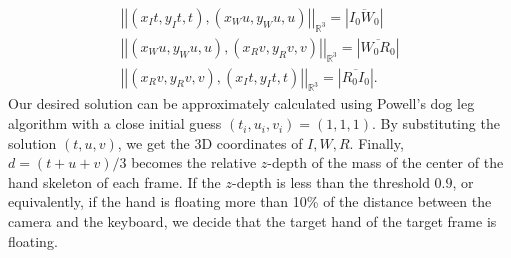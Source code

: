 \documentclass{article}
\begin{document}
\begin{gather}
    \left||(x_{I}t,y_{I}t,t),(x_{W}u,y_{W}u,u)|\right|_{\mathbb{R}^3}=\left|\overline{I_{0}W_{0}}\right| \\
    \left||(x_{W}u,y_{W}u,u),(x_{R}v,y_{R}v,v)|\right|_{\mathbb{R}^3}=\left|\overline{W_{0}R_{0}}\right| \\
    \left||(x_{R}v,y_{R}v,v),(x_{I}t,y_{I}t,t)|\right|_{\mathbb{R}^3}=\left|\overline{R_{0}I_{0}}\right|.
\end{gather}
%
Our desired solution can be approximately calculated using Powell's dog leg algorithm with a close initial guess $(t_i,u_i,v_i)=(1,1,1)$. By substituting the solution $(t,u,v)$, we get the 3D coordinates of $I,W,R$.  Finally, $d=(t+u+v)/3$ becomes the relative $z$-depth of the mass of the center of the hand skeleton of each frame. If the $z$-depth is less than the threshold $0.9$, or equivalently, if the hand is floating more than 10\% of the distance between the camera and the keyboard, we decide that the target hand of the target frame is floating.

\end{document}
